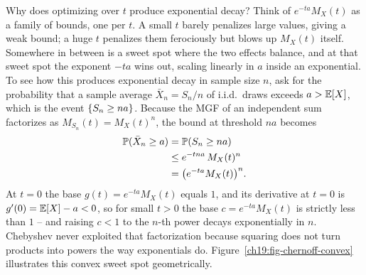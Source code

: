 \begin{whybox}
Why does optimizing over $t$ produce exponential decay? Think of $e^{-ta}M_X(t)$
as a family of bounds, one per $t$. A small $t$ barely penalizes large values,
giving a weak bound; a huge $t$ penalizes them ferociously but blows up
$M_X(t)$ itself. Somewhere in between is a sweet spot where the two effects
balance, and at that sweet spot the exponent $-ta$ wins out, scaling linearly
in $a$ inside an exponential. To see how this produces exponential decay in sample size $n$,
ask for the probability that a sample average $\bar X_n = S_n/n$ of i.i.d.\ draws exceeds
$a > \E[X]$, which is the event $\set{S_n \ge na}$. Because the MGF of an independent sum
factorizes as $M_{S_n}(t) = M_X(t)^n$, the bound at threshold $na$ becomes
\begin{align*}
  \P(\bar X_n \ge a) &= \P(S_n \ge na) \\
  &\le e^{-tna}\,M_X(t)^n \\
  &= \bigl(e^{-ta}M_X(t)\bigr)^n.
\end{align*}
At $t = 0$ the base $g(t) = e^{-ta}M_X(t)$ equals $1$, and its derivative at $t = 0$ is
$g'(0) = \E[X] - a < 0$, so for small $t > 0$ the base $c = e^{-ta}M_X(t)$ is strictly
less than $1$ -- and raising $c < 1$ to the $n$-th power decays exponentially in $n$.
Chebyshev never exploited that factorization because squaring does not turn products into
powers the way exponentials do. Figure~\ref{ch19:fig-chernoff-convex} illustrates this
convex sweet spot geometrically.
\end{whybox}

